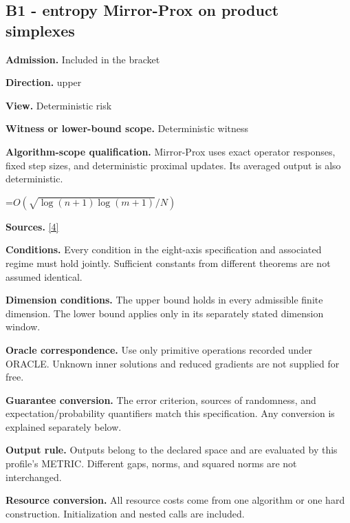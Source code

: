 \documentclass[10pt,a4paper]{article}
\newcommand{\AtlasMath}[1]{\par\begingroup\centering\setbox0=\hbox{$\displaystyle #1$}\ifdim\wd0>1.4\linewidth\typeout{ATLAS WIDE FORMULA: \the\wd0}\fi\ifdim\wd0>\linewidth\resizebox{\linewidth}{!}{\box0}\else\box0\fi\par\endgroup}
\begin{document}
\subsection{B1 - entropy Mirror-Prox on product simplexes}


\textbf{Admission.} Included in the bracket



\textbf{Direction.} upper



\textbf{View.} Deterministic risk



\textbf{Witness or lower-bound scope.} Deterministic witness



\textbf{Algorithm-scope qualification.} Mirror-Prox uses exact operator responses, fixed step sizes, and deterministic proximal updates. Its averaged output is also deterministic.



\AtlasMath{O(\sqrt{\log(n+1)\log(m+1)}/N)}


\textbf{Sources.} \href{https://www2.isye.gatech.edu/~nemirovs/SIOPT_MP_2004.pdf}{[4]}



\textbf{Conditions.} Every condition in the eight-axis specification and associated regime must hold jointly. Sufficient constants from different theorems are not assumed identical.



\textbf{Dimension conditions.} The upper bound holds in every admissible finite dimension. The lower bound applies only in its separately stated dimension window.



\textbf{Oracle correspondence.} Use only primitive operations recorded under ORACLE. Unknown inner solutions and reduced gradients are not supplied for free.



\textbf{Guarantee conversion.} The error criterion, sources of randomness, and expectation/probability quantifiers match this specification. Any conversion is explained separately below.



\textbf{Output rule.} Outputs belong to the declared space and are evaluated by this profile's METRIC. Different gaps, norms, and squared norms are not interchanged.



\textbf{Resource conversion.} All resource costs come from one algorithm or one hard construction. Initialization and nested calls are included.
\end{document}

